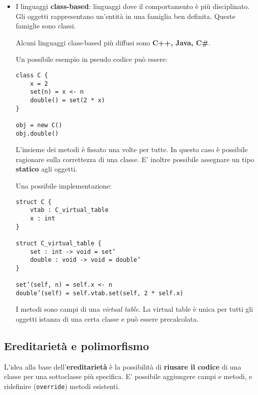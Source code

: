 \documentclass{article}
\begin{document}
\begin{itemize}
    \item I linguaggi \textbf{class-based}: linguaggi dove il comportamento è più disciplinato. Gli oggetti rappresentano un'entità in una famiglia ben definita. Queste famiglie sono classi.
    
    Alcuni linguaggi class-based più diffusi sono \textbf{C++, Java, C\#}.

    Un possibile esempio in pseudo codice può essere:
\begin{tcolorbox}
\begin{verbatim}
class C {
    x = 2
    set(n) = x <- n
    double() = set(2 * x)
}

obj = new C()
obj.double()
\end{verbatim}
\end{tcolorbox}
    L'insieme dei metodi è fissato una volte per tutte. In questo caso è possibile ragionare sulla correttezza di una classe. E' inoltre possibile assegnare un tipo \textbf{statico} agli oggetti.

    Una possibile implementazione:
\begin{tcolorbox}
\begin{verbatim}
struct C {
    vtab : C_virtual_table
    x : int
}

struct C_virtual_table {
    set : int -> void = set’
    double : void -> void = double’
}

set’(self, n) = self.x <- n
double’(self) = self.vtab.set(self, 2 * self.x)
\end{verbatim}
\end{tcolorbox}
    I metodi sono campi di una \textit{virtual table}. La virtual table è unica per tutti gli oggetti istanza di una certa classe e può essere precalcolata.
\end{itemize}

\pagebreak

\subsection*{Ereditarietà e polimorfismo}
L'idea alla base dell'\textbf{ereditarietà} è la possibilità di \textbf{riusare il codice} di una classe per una sottoclasse più specifica. E' possibile aggiungere campi e metodi, e ridefinire (\texttt{override}) metodi esistenti.
\end{document}

